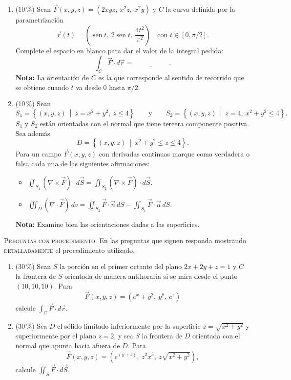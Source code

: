 \documentclass[11pt]{article}
\begin{document}
\begin{enumerate}
\item{} (10\,\%) Sean $\vec F(x,y,z) = (2xyz,\ x^2z,\ x^2y)$ y $C$ la curva definida por la parametrización
\[
\vec r(t) = \left(\operatorname{sen} t,\ 2\operatorname{sen} t,\ \frac{4t^2}{\pi^2}\right)\quad\text{con } t \in [0,\pi/2].
\]
Complete el espacio en blanco para dar el valor de la integral pedida:
\[
\int_C \vec F \cdot d\vec r = \underline{\phantom{XXXXXX}}\,.
\]
\noindent\textbf{Nota:} La orientación de $C$ es la que corresponde al sentido de recorrido que se obtiene cuando $t$ va desde $0$ hasta $\pi/2$.

\item{} (10\,\%) Sean
\[
S_1 = \left\{(x,y,z)\ \middle|\ z = x^2+y^2,\ z \leq 4\right\}
\qquad\text{y}\qquad
S_2 = \left\{(x,y,z)\ \middle|\ z = 4,\ x^2+y^2 \leq 4\right\}.
\]
$S_1$ y $S_2$ están orientadas con el normal que tiene tercera componente positiva. Sea además
\[
D = \left\{(x,y,z)\ \middle|\ x^2+y^2 \leq z \leq 4\right\}.
\]
Para un campo $\vec F(x,y,z)$ con derivadas continuas marque como verdadera o falsa cada una de las siguientes afirmaciones:
\begin{itemize}
\item[(a)] $\displaystyle \iint_{S_1} (\nabla \times \vec F)\cdot d\vec S = \iint_{S_2} (\nabla \times \vec F)\cdot d\vec S$. \hfill \fbox{\phantom{V}}
\item[(b)] $\displaystyle \iiint_D (\nabla \cdot \vec F)\,dv = \iint_{S_2} \vec F \cdot \vec n\,dS - \iint_{S_1} \vec F \cdot \vec n\,dS$. \hfill \fbox{\phantom{V}}
\end{itemize}
\noindent\textbf{Nota:} Examine bien las orientaciones dadas a las superficies.

\end{enumerate}

\vspace{4pt}
\noindent\textsc{Preguntas con procedimiento.} En las preguntas que siguen responda mostrando \textsc{detalladamente} el procedimiento utilizado.

\begin{enumerate}[start=5]
\item{} (30\,\%) Sean $S$ la porción en el primer octante del plano $2x+2y+z = 1$ y $C$ la frontera de $S$ orientada de manera antihoraria si se mira desde el punto $(10,10,10)$. Para
\[
\vec F(x,y,z) = (e^x + y^2,\ y^8,\ e^z)
\]
calcule $\displaystyle \int_C \vec F \cdot d\vec r$.

\item{} (30\,\%) Sea $D$ el sólido limitado inferiormente por la superficie $z = \sqrt{x^2+y^2}$ y superiormente por el plano $z = 2$, y sea $S$ la frontera de $D$ orientada con el normal que apunta hacia afuera de $D$. Para
\[
\vec F(x,y,z) = \left(e^{(y+z)},\ z^2x^5,\ z\sqrt{x^2+y^2}\right),
\]
calcule $\displaystyle \iint_S \vec F \cdot d\vec S$.
\end{enumerate}

\examfooter
\end{document}
